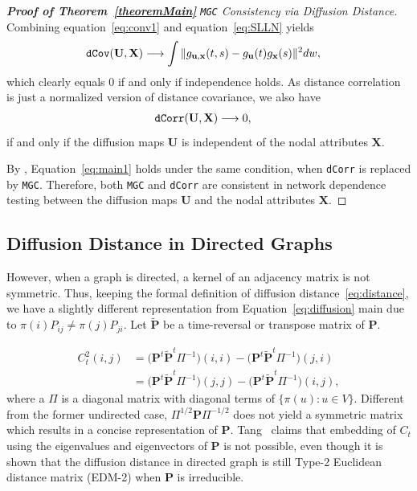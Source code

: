 \documentclass[11pt]{article}
\theoremstyle{definition}
\begin{document}
\begin{proof}[\textbf{Proof of Theorem~\ref{theoremMain}} \texttt{MGC} Consistency via Diffusion Distance]

Combining equation~\ref{eq:conv1} and equation~\ref{eq:SLLN} yields
\begin{eqnarray}
\mbox{\texttt{dCov}}(\mathbf{U},\mathbf{X}) &\longrightarrow \displaystyle\int{\|g_{\mathbf{u},\mathbf{x}}(t,s)-g_{\mathbf{u}}(t)g_{\mathbf{x}}(s)\|^{2}}dw,
\label{eq:main2}
\end{eqnarray}
which clearly equals $0$ if and only if independence holds. As distance correlation is just a normalized version of distance covariance, we also have 
\begin{eqnarray}
\mbox{\texttt{dCorr}}(\mathbf{U},\mathbf{X}) &\longrightarrow 0,
\label{eq:main1}
\end{eqnarray}
if and only if the diffusion maps $\mathbf{U}$ is independent of the nodal attributes $\mathbf{X}$.

By \cite{shen2016discovering}, Equation~\ref{eq:main1} holds under the same condition, when \texttt{dCorr} is replaced by \texttt{MGC}. Therefore, both \texttt{MGC} and \texttt{dCorr} are consistent in network dependence testing between the diffusion maps $\mathbf{U}$ and the nodal attributes $\mathbf{X}$.
\end{proof}

\subsection{Diffusion Distance in Directed Graphs}
\label{ssec:directed}

However, when a graph is directed, a kernel of an adjacency matrix is not symmetric. Thus, keeping the formal definition of diffusion distance~\ref{eq:distance}, we have a slightly different representation from Equation~\ref{eq:diffusion} main due to $\pi(i) P_{ij} \neq \pi(j) P_{ji}$. Let $\tilde{\mathbf{P}}$ be a time-reversal or transpose matrix of $\mathbf{P}$.

\begin{equation}
\begin{split}
\label{eq:directed}
C^2_{t}(i,j)  & = \big( \mathbf{P}^{t} \tilde{ \mathbf{P} }^{t} \Pi^{-1} \big)(i,i) - \big( \mathbf{P}^{t} \tilde{ \mathbf{P} }^{t} \Pi^{-1} \big)(j,i) \\ & = \big( \mathbf{P}^{t} \tilde{ \mathbf{P} }^{t} \Pi^{-1} \big)(j,j) - \big( \mathbf{P}^{t} \tilde{ \mathbf{P}}^{t} \Pi^{-1} \big) (i,j),
\end{split}  
\end{equation}
where a $\Pi$ is a diagonal matrix with diagonal terms of $\{ \pi(u) : u \in V \}$. 
Different from the former undirected case, $\Pi^{1/2} \mathbf{P} \Pi^{-1/2}$ does not yield a symmetric matrix which results in a concise representation of $\mathbf{P}$. Tang~\cite{tang2010graph} claims that embedding of $C_{t}$ using the eigenvalues and eigenvectors of $\mathbf{P}$ is not possible, even though it is shown that the diffusion distance in directed graph is still Type-2 Euclidean distance matrix (EDM-2) when $\mathbf{P}$ is irreducible. 
\end{document}
